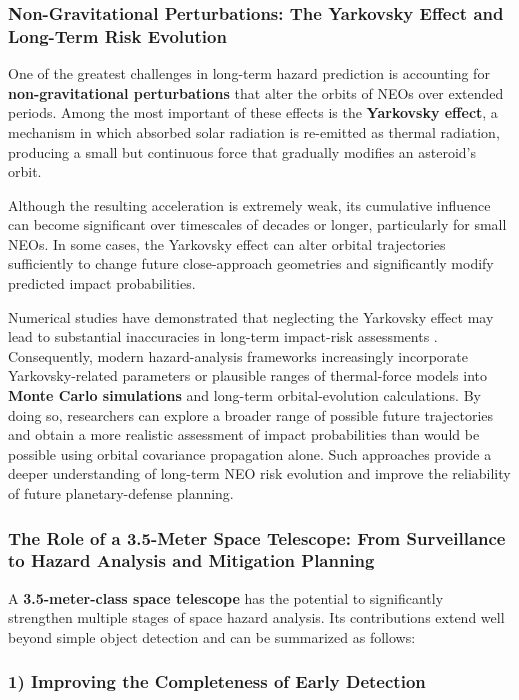 \subsubsection{Non-Gravitational Perturbations: The Yarkovsky Effect and Long-Term Risk Evolution}

One of the greatest challenges in long-term hazard prediction is accounting for \textbf{non-gravitational perturbations} that alter the orbits of NEOs over extended periods. Among the most important of these effects is the \textbf{Yarkovsky effect}, a mechanism in which absorbed solar radiation is re-emitted as thermal radiation, producing a small but continuous force that gradually modifies an asteroid's orbit.

Although the resulting acceleration is extremely weak, its cumulative influence can become significant over timescales of decades or longer, particularly for small NEOs. In some cases, the Yarkovsky effect can alter orbital trajectories sufficiently to change future close-approach geometries and significantly modify predicted impact probabilities.

Numerical studies have demonstrated that neglecting the Yarkovsky effect may lead to substantial inaccuracies in long-term impact-risk assessments \cite{vokrouhlicky2015}. Consequently, modern hazard-analysis frameworks increasingly incorporate Yarkovsky-related parameters or plausible ranges of thermal-force models into \textbf{Monte Carlo simulations} and long-term orbital-evolution calculations. By doing so, researchers can explore a broader range of possible future trajectories and obtain a more realistic assessment of impact probabilities than would be possible using orbital covariance propagation alone. Such approaches provide a deeper understanding of long-term NEO risk evolution and improve the reliability of future planetary-defense planning.

\subsubsection{The Role of a 3.5-Meter Space Telescope: From Surveillance to Hazard Analysis and Mitigation Planning}

A \textbf{3.5-meter-class space telescope} has the potential to significantly strengthen multiple stages of space hazard analysis. Its contributions extend well beyond simple object detection and can be summarized as follows:

\subsubsection{1) Improving the Completeness of Early Detection}\label{improving-the-completeness-of-early-detection}


